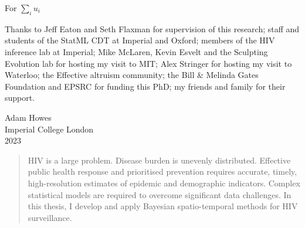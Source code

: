 \documentclass[a4paper, nobind]{templates/ociamthesis}
\begin{document}

\begin{romanpages}

\maketitle

\begin{dedication}
  For \(\sum_i u_i\)
\end{dedication}

\begin{acknowledgements}
 	Thanks to Jeff Eaton and Seth Flaxman for supervision of this research;
 staff and students of the StatML CDT at Imperial and Oxford;
 members of the HIV inference lab at Imperial;
 Mike McLaren, Kevin Esvelt and the Sculpting Evolution lab for hosting my visit to MIT;
 Alex Stringer for hosting my visit to Waterloo;
 the Effective altruism community;
 the Bill \& Melinda Gates Foundation and EPSRC for funding this PhD;
 my friends and family for their support.

 \begin{flushright}
 Adam Howes \\
 Imperial College London\\
 2023
 \end{flushright}
\end{acknowledgements}


\begin{abstract}
	HIV is a large problem.
Disease burden is unevenly distributed.
Effective public health response and prioritised prevention requires accurate, timely, high-resolution estimates of epidemic and demographic indicators.
Complex statistical models are required to overcome significant data challenges.
In this thesis, I develop and apply Bayesian spatio-temporal methods for HIV surveillance.
\end{abstract}


\end{romanpages}
\end{document}

